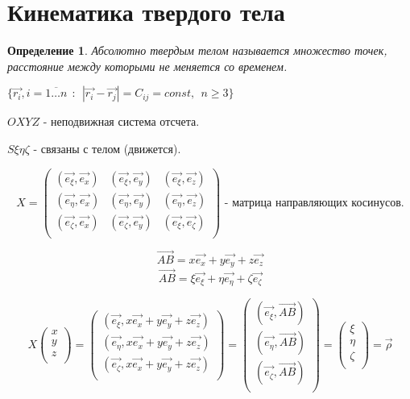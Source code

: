 \documentclass{article}
\renewcommand{\v}[1]{{\vec{#1}}}
\newtheorem*{df}{Определение}
\begin{document}
  
  \section{Кинематика твердого тела}
  \begin{df}
  Абсолютно твердым телом называется множество точек, расстояние между которыми не меняется со временем.
  
  $  \{ \v{r_i}, i = \overline{1 \ldots n} ~~:~~|\v{r_i} - \v{r_j} | = C_{ij} = const ,~~ n \geqslant 3 \}$ 
  
  \end{df}
  
  $OXYZ$ - неподвижная система отсчета.
  
  $S\xi\eta\zeta$ - связаны с телом (движется).
 
  $$
  X = 
  \left(
  \begin{matrix} 
  (\v{e_{\xi}}, \v{e_{x}}) & 
  (\v{e_{\xi}}, \v{e_{y}}) & 
  (\v{e_{\xi}}, \v{e_{z}}) \\ 
  (\v{e_{\eta}}, \v{e_{x}}) & 
  (\v{e_{\eta}}, \v{e_{y}}) & 
  (\v{e_{\eta}}, \v{e_{z}}) \\  
  (\v{e_{\zeta}}, \v{e_{x}}) & 
  (\v{e_{\zeta}}, \v{e_{y}}) & 
  (\v{e_{\xi}}, \v{e_{\zeta}}) \\
  \end{matrix}
  \right)
  \text{ - матрица направляющих косинусов.}
  $$
 
  $$ \v{AB} = x\v{e_x} + y\v{e_y} + z\v{e_z} $$
  $$ \v{AB} = \xi\v{e_{\xi}} + \eta\v{e_{\eta}} + \zeta\v{e_{\zeta}} $$

  $$ X
  \left(
  \begin{matrix}
    x \\ y \\ z \\
  \end{matrix}
  \right)
  =
  \left(
  \begin{matrix}
  (\v{e_{\xi}}, x\v{e_x} + y \v{e_y} + z \v{e_z}) \\
  (\v{e_{\eta}}, x\v{e_x} + y \v{e_y} + z \v{e_z}) \\
  (\v{e_{\zeta}}, x\v{e_x} + y \v{e_y} + z \v{e_z}) \\
  \end{matrix}
  \right)
  = 
  \left(
  \begin{matrix}
  (\v{e_{\xi}}, \v{AB}) \\
  (\v{e_{\eta}}, \v{AB}) \\
  (\v{e_{\zeta}}, \v{AB}) \\
  \end{matrix}
  \right)
  =
  \left(
  \begin{matrix}
  \xi \\
  \eta \\
  \zeta \\
  \end{matrix}
  \right)
  =
  \v{\rho}
  $$
\end{document}

